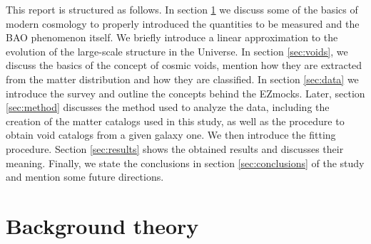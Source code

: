 \documentclass[fleqn, usenatbib]{mnras}
\begin{document}
This report is structured as follows. In section \ref{sec:theory} we discuss some of the basics of modern cosmology to properly introduced the quantities to be measured and the BAO phenomenon itself. We briefly introduce a linear approximation to the evolution of the large-scale structure in the Universe. In section \ref{sec:voids}, we discuss the basics of the concept of cosmic voids, mention how they are extracted from the matter distribution and how they are classified. In section \ref{sec:data} we introduce the survey and outline the concepts behind the EZmocks. Later, section \ref{sec:method} discusses the method used to analyze the data, including the creation of the matter catalogs used in this study, as well as the procedure to obtain void catalogs from a given galaxy one. We then introduce the fitting procedure. Section \ref{sec:results} shows the obtained results and discusses their meaning. Finally, we state the conclusions in section \ref{sec:conclusions} of the study and mention some future directions.

\section{Background theory}
\label{sec:theory}
\end{document}
